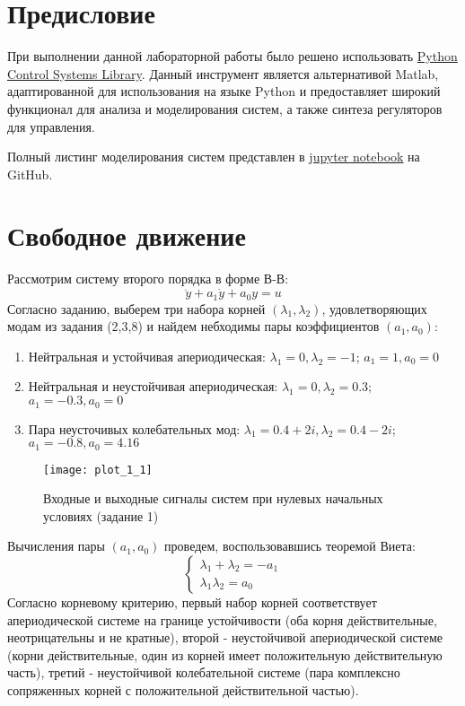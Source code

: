 \tableofcontents
\section*{Предисловие}
При выполнении данной лабораторной работы было решено использовать 
\href{https://python-control.readthedocs.io/en/0.9.4/}{Python Control Systems Library}.
Данный инструмент является альтернативой Matlab, адаптированной для использования на 
языке Python и предоставляет широкий функционал для анализа и моделирования систем,
а также синтеза регуляторов для управления.

Полный листинг моделирования систем представлен в \href{https://github.com/diuzhevVlad/control-theory-itmo-fall-2023/blob/main/Lab2/Lab2.ipynb}{jupyter notebook} на GitHub.

\pagebreak

\section{Свободное движение}
Рассмотрим систему второго порядка в форме В-В:
\begin{equation}
    \ddot{y} + a_1 \dot{y} + a_0 y  = u
\end{equation}
Согласно заданию, выберем три набора корней $(\lambda_1, \lambda_2)$, удовлетворяющих модам из задания (2,3,8)
и найдем небходимы пары коэффициентов $(a_1, a_0)$:
\begin{enumerate}
    \item Нейтральная и устойчивая апериодическая: $\lambda_1 = 0, \lambda_2 = -1$; $a_1 = 1, a_0 = 0$
    \item Нейтральная и неустойчивая апериодическая: $\lambda_1 = 0, \lambda_2 = 0.3$; $a_1 = -0.3, a_0 = 0$
    \item Пара неусточивых колебательных мод: $\lambda_1 = 0.4 + 2i, \lambda_2 = 0.4 - 2i$; $a_1 = -0.8, a_0 = 4.16$
\end{enumerate}


\begin{figure}[h]
    \centering
    \texttt{[image: plot\_1\_1]}
    \caption{\label{fig:The-caption-1}Входные и выходные сигналы систем при нулевых начальных условиях (задание 1)}
\end{figure}

Вычисления пары $(a_1, a_0)$ проведем, воспользовавшись теоремой Виета:
\begin{equation*}
    \begin{cases}
        \lambda_1 + \lambda_2 = - a_1 \\
        \lambda_1 \lambda_2 = a_0
    \end{cases}
\end{equation*}
Согласно корневому критерию, первый набор корней соответствует апериодической системе на границе 
 устойчивости (оба корня действительные, неотрицательны и не кратные), второй - неустойчивой 
 апериодической системе (корни действительные, один из корней имеет положительную действительную часть),
 третий - неустойчивой колебательной системе (пара комплексно сопряженных корней с положительной 
 действительной частью).

